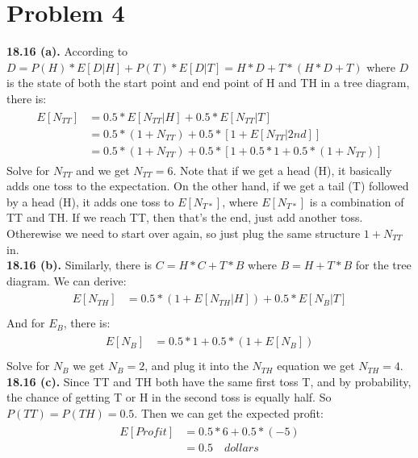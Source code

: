 \documentclass[titlepage, paper=a4, fontsize=11pt]{scrartcl} %
\numberwithin{equation}{section} %
\numberwithin{figure}{section} %
\numberwithin{table}{section} %
\begin{document}
\section*{Problem 4}
\textbf{18.16 (a).}
According to $D = P(H) * E[D | H] + P(T) * E[D | T] = H * D + T * (H * D + T)$ where $D$ is the state of both the start point and end point of H and TH in a tree diagram, there is:
\begin{align*} 
\begin{split}
E[N_{TT}] &= 0.5 * E[N_{TT} | H] + 0.5 * E[N_{TT} | T] \\
&= 0.5 * (1 + N_{TT}) + 0.5 * [1 + E[N_{TT} | 2nd]] \\
&= 0.5 * (1 + N_{TT}) + 0.5 * [1 + 0.5 * 1 + 0.5 * (1 + N_{TT})]
\end{split}					
\end{align*}
Solve for $N_{TT}$ and we get $N_{TT} = 6$.
Note that if we get a head (H), it basically adds one toss to the expectation. On the other hand, if we get a tail (T) followed by a head (H), it adds one toss to $E[N_{T*}]$, where $E[N_{T*}]$ is a combination of TT and TH. If we reach TT, then that's the end, just add another toss. Otherewise we need to start over again, so just plug the same structure $1 + N_{TT}$ in.
\\
\textbf{18.16 (b).}
Similarly, there is $C = H * C + T * B$ where $B = H + T * B$ for the tree diagram. We can derive:
\begin{align*} 
\begin{split}
E[N_{TH}] &= 0.5 * ( 1 + E[N_{TH} | H] ) + 0.5 * E[N_{B} | T] \\
\end{split}					
\end{align*}
And for $E_{B}$, there is:
\begin{align*} 
\begin{split}
E[N_{B}] &= 0.5 * 1 + 0.5 * ( 1 + E[N_{B}] ) \\
\end{split}					
\end{align*}
Solve for $N_{B}$ we get $N_{B} = 2$, and plug it into the $N_{TH}$ equation we get $N_{TH} = 4$.
\\
\textbf{18.16 (c).}
Since TT and TH both have the same first toss T, and by probability, the chance of getting T or H in the second toss is equally half. So $P(TT) = P(TH) = 0.5$. Then we can get the expected profit:
\begin{align*} 
\begin{split}
E[Profit] &= 0.5 * 6 + 0.5 * (-5) \\
&= 0.5 \quad dollars
\end{split}					
\end{align*}
\\
\end{document}
